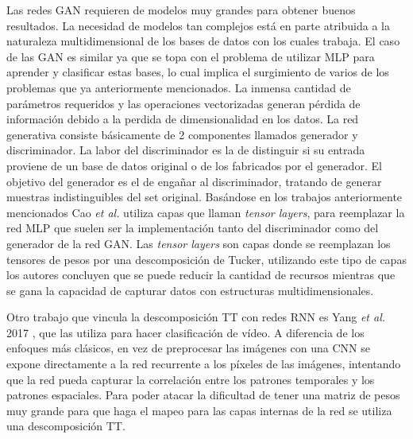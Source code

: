 \documentclass[spanish]{article}
\theoremstyle{definition}
\theoremstyle{remark}
\numberwithin{equation}{section}
\numberwithin{equation}{section} %
\begin{document}
Las redes GAN requieren de modelos muy grandes para obtener buenos resultados. La necesidad de modelos tan complejos está en parte atribuida a la naturaleza multidimensional de los bases de datos con los cuales trabaja. El caso de las GAN es similar ya que se topa con el problema de utilizar MLP para aprender y clasificar estas bases, lo cual implica el surgimiento de varios de los problemas que ya anteriormente mencionados. La inmensa cantidad de parámetros requeridos y las operaciones vectorizadas generan pérdida de información debido a la perdida de dimensionalidad en los datos. La red generativa consiste básicamente de 2 componentes llamados generador y discriminador. La labor del discriminador es la de distinguir si su entrada proviene de un base de  datos original o de los fabricados por el generador. El objetivo del generador es el de engañar al discriminador, tratando de generar muestras indistinguibles del set original. Basándose en los trabajos anteriormente mencionados \cite{novikov2015tensorizing,kossaifi2017tensor} Cao \textit{et al.}\cite{cao2018tensorizing} utiliza capas que llaman \textit{tensor layers}, para reemplazar la red MLP que suelen ser la implementación tanto del discriminador como del generador de la red GAN. Las \textit{tensor layers} son capas donde  se reemplazan los tensores de pesos por una descomposición de Tucker, utilizando este tipo de capas los autores concluyen que se puede reducir la cantidad de recursos mientras que se gana la capacidad de capturar datos con estructuras multidimensionales. \par
Otro trabajo que vincula la descomposición TT con redes RNN es Yang \textit{et al.} 2017 \cite{yang2017tensor}, que las utiliza para hacer clasificación de vídeo. A diferencia de los enfoques más clásicos, en vez de preprocesar las imágenes con una CNN se expone directamente a la red recurrente a los píxeles de las imágenes, intentando que la red pueda capturar la correlación entre los patrones temporales y los patrones espaciales. Para poder atacar la dificultad de tener una matriz de pesos muy grande para que haga el mapeo para las capas internas de la red se utiliza una descomposición TT.
\end{document}
